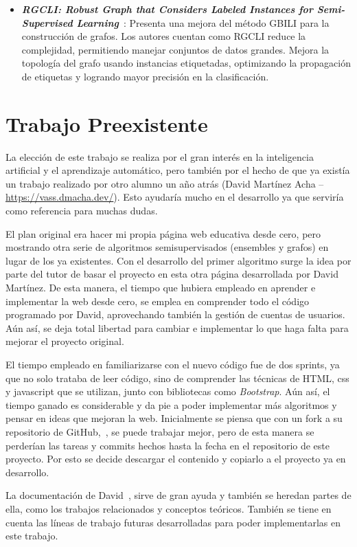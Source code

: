 \begin{itemize}
	\item \textbf{\textit{RGCLI: Robust Graph that Considers Labeled Instances for Semi-Supervised Learning}}~\cite{rgcli}: Presenta una mejora del método GBILI para la construcción de grafos. Los autores cuentan como RGCLI reduce la complejidad, permitiendo manejar conjuntos de datos grandes. Mejora la topología del grafo usando instancias etiquetadas, optimizando la propagación de etiquetas y logrando mayor precisión en la clasificación.
\end{itemize}
\section{Trabajo Preexistente}
La elección de este trabajo se realiza por el gran interés en la inteligencia artificial y el aprendizaje automático, pero también por el hecho de que ya existía un trabajo realizado por otro alumno un año atrás (David Martínez Acha -- \url{https://vass.dmacha.dev/}). Esto ayudaría mucho en el desarrollo ya que serviría como referencia para muchas dudas.

El plan original era hacer mi propia página web educativa desde cero, pero mostrando otra serie de algoritmos semisupervisados (ensembles y grafos) en lugar de los ya existentes. Con el desarrollo del primer algoritmo surge la idea por parte del tutor de basar el proyecto en esta otra página desarrollada por David Martínez. De esta manera, el tiempo que hubiera empleado en aprender e implementar la web desde cero, se emplea en comprender todo el código programado por David, aprovechando también la gestión de cuentas de usuarios. Aún así, se deja total libertad para cambiar e implementar lo que haga falta para mejorar el proyecto original.

El tiempo empleado en familiarizarse con el nuevo código fue de dos sprints, ya que no solo trataba de leer código, sino de comprender las técnicas de HTML, css y javascript que se utilizan, junto con bibliotecas como \textit{Bootstrap}.
Aún así, el tiempo ganado es considerable y da pie a poder implementar más algoritmos y pensar en ideas que mejoran la web.
Inicialmente se piensa que con un fork a su repositorio de GitHub,~\cite{GH:VASS}, se puede trabajar mejor, pero de esta manera se perderían las tareas y commits hechos hasta la fecha en el repositorio de este proyecto. Por esto se decide descargar el contenido y copiarlo a el proyecto ya en desarrollo.

La documentación de David~\cite{TFG:David}, sirve de gran ayuda y también se heredan partes de ella, como los trabajos relacionados y conceptos teóricos. También se tiene en cuenta las líneas de trabajo futuras desarrolladas para poder implementarlas en este trabajo.
